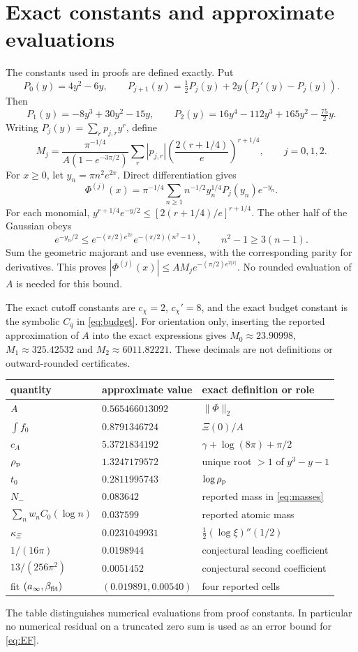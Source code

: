 \section{Exact constants and approximate evaluations}\label{app:constants}

The constants used in proofs are defined exactly. Put
\[
 P_0(y)=4y^2-6y,\qquad
 P_{j+1}(y)=\tfrac12P_j(y)+2y(P_j'(y)-P_j(y)).
\]
Then
\[
 P_1(y)=-8y^3+30y^2-15y,\qquad
 P_2(y)=16y^4-112y^3+165y^2-\tfrac{75}{2}y.
\]
Writing $P_j(y)=\sum_r p_{j,r}y^r$, define
\[
 M_j=\frac{\pi^{-1/4}}{A(1-e^{-3\pi/2})}
       \sum_r|p_{j,r}|
       \left(\frac{2(r+1/4)}{e}\right)^{r+1/4},
 \qquad j=0,1,2.
\]
For $x\ge0$, let $y_n=\pi n^2e^{2x}$. Direct differentiation gives
\[
 \Phi^{(j)}(x)=\pi^{-1/4}\sum_{n\ge1}
             n^{-1/2}y_n^{1/4}P_j(y_n)e^{-y_n}.
\]
For each monomial,
$y^{r+1/4}e^{-y/2}\le[2(r+1/4)/e]^{r+1/4}$.
The other half of the Gaussian obeys
\[
 e^{-y_n/2}\le e^{-(\pi/2)e^{2x}}e^{-(\pi/2)(n^2-1)},
 \qquad n^2-1\ge3(n-1).
\]
Sum the geometric majorant and use evenness, with the corresponding
parity for derivatives. This proves
$|\Phi^{(j)}(x)|\le AM_j e^{-(\pi/2)e^{2|x|}}$.
No rounded evaluation of $A$ is needed for this bound.

The exact cutoff constants are $c_\chi=2$, $c_\chi'=8$, and the exact
budget constant is the symbolic $C_q$ in \eqref{eq:budget}.
For orientation only, inserting the reported approximation of $A$
into the exact expressions gives
$M_0\approx23.90998$, $M_1\approx325.42532$ and
$M_2\approx6011.82221$. These decimals are not definitions or
outward-rounded certificates.

\begin{center}\small
\begin{tabular}{@{}lll@{}}\toprule
quantity & approximate value & exact definition or role\\ \midrule
$A$ & $0.565466013092$ & $\|\Phi\|_2$\\
$\int f_0$ & $0.8791346724$ & $\Xi(0)/A$\\
$c_A$ & $5.3721834192$ & $\gamma+\log(8\pi)+\pi/2$\\
$\rho_{\mathrm{p}}$ & $1.3247179572$ & unique root $>1$ of $y^3-y-1$\\
$t_0$ & $0.2811995743$ & $\log\rho_{\mathrm{p}}$\\
$N_-$ & $0.083642$ & reported mass in \eqref{eq:masses}\\
$\sum_nw_nC_0(\log n)$ & $0.037599$ & reported atomic mass\\
$\kappa_\Xi$ & $0.0231049931$ & $\tfrac12(\log\xi)''(1/2)$\\
$1/(16\pi)$ & $0.0198944$ & conjectural leading coefficient\\
$13/(256\pi^2)$ & $0.0051452$ & conjectural second coefficient\\
fit $(a_\infty,\beta_{\rm fit})$ & $(0.019891,0.00540)$ & four reported cells\\
\bottomrule\end{tabular}
\end{center}
The table distinguishes numerical evaluations from proof constants.
In particular no numerical residual on a truncated zero sum is used
as an error bound for \eqref{eq:EF}.
